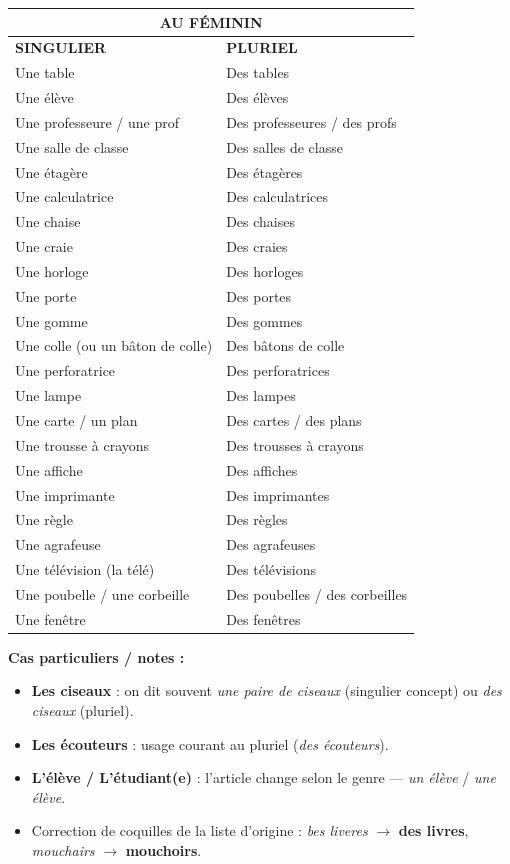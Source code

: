 \documentclass[11pt]{article}
\begin{document}
\begin{center}
\begin{tabular}{|p{7.5cm}|p{7.5cm}|}
\hline
\multicolumn{2}{|c|}{\textbf{AU FÉMININ}}\\
\hline
\textbf{SINGULIER} & \textbf{PLURIEL} \\
\hline
Une table & Des tables \\
\hline
Une élève & Des élèves \\
\hline
Une professeure / une prof & Des professeures / des profs \\
\hline
Une salle de classe & Des salles de classe \\
\hline
Une étagère & Des étagères \\
\hline
Une calculatrice & Des calculatrices \\
\hline
Une chaise & Des chaises \\
\hline
Une craie & Des craies \\
\hline
Une horloge & Des horloges \\
\hline
Une porte & Des portes \\
\hline
Une gomme & Des gommes \\
\hline
Une colle (ou un bâton de colle) & Des bâtons de colle \\
\hline
Une perforatrice & Des perforatrices \\
\hline
Une lampe & Des lampes \\
\hline
Une carte / un plan & Des cartes / des plans \\
\hline
Une trousse à crayons & Des trousses à crayons \\
\hline
Une affiche & Des affiches \\
\hline
Une imprimante & Des imprimantes \\
\hline
Une règle & Des règles \\
\hline
Une agrafeuse & Des agrafeuses \\
\hline
Une télévision (la télé) & Des télévisions \\
\hline
Une poubelle / une corbeille & Des poubelles / des corbeilles \\
\hline
Une fenêtre & Des fenêtres \\
\hline
\end{tabular}
\end{center}

\vspace{8pt}

\noindent\textbf{Cas particuliers / notes :}
\begin{itemize}
  \item \textbf{Les ciseaux} : on dit souvent \emph{une paire de ciseaux} (singulier concept) ou \emph{des ciseaux} (pluriel).
  \item \textbf{Les écouteurs} : usage courant au pluriel (\emph{des écouteurs}).
  \item \textbf{L'élève / L'étudiant(e)} : l'article change selon le genre — \emph{un élève} / \emph{une élève}.
  \item Correction de coquilles de la liste d'origine : \textit{bes liveres} $\to$ \textbf{des livres}, \textit{mouchairs} $\to$ \textbf{mouchoirs}.
\end{itemize}
\end{document}
